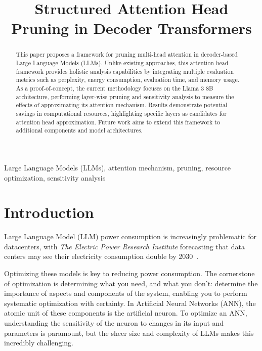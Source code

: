 \documentclass[conference]{IEEEtran}
\begin{document}
    \title{Structured Attention Head Pruning in Decoder Transformers}

    \author{
    }

    \maketitle

    \begin{abstract}
        This paper proposes a framework for pruning multi-head attention in decoder-based Large Language Models (LLMs).
        Unlike existing approaches, this attention head framework provides holistic analysis capabilities by integrating multiple evaluation metrics such as perplexity, energy consumption, evaluation time, and memory usage.
        As a proof-of-concept, the current methodology focuses on the Llama 3 8B architecture, performing layer-wise pruning and sensitivity analysis to measure the effects of approximating its attention mechanism.
        Results demonstrate potential savings in computational resources, highlighting specific layers as candidates for attention head approximation.
        Future work aims to extend this framework to additional components and model architectures.
    \end{abstract}

    \begin{IEEEkeywords}
        Large Language Models (LLMs), attention mechanism, pruning, resource optimization, sensitivity analysis
    \end{IEEEkeywords}

    \section{Introduction}
    Large Language Model (LLM) power consumption is increasingly problematic for datacenters, with \textit{The Electric Power
    Research Institute} forecasting that data centers may see their electricity consumption double by
    2030~\cite{kindig2024}.

    Optimizing these models is key to reducing power consumption.
    The cornerstone of optimization is determining what you need, and what you don't: determine the importance of
    aspects and components of the system, enabling you to perform systematic optimization with certainty.
    In Artificial Neural Networks (ANN), the atomic unit of these components is the artificial neuron.
    To optimize an ANN, understanding the sensitivity of the neuron to changes in its input and parameters is paramount,
    but the sheer size and complexity of LLMs makes this incredibly challenging.
\end{document}
